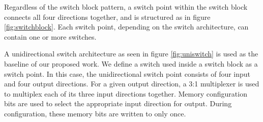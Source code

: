 Regardless of the switch block pattern, a switch point within the switch block connects all four directions together, and is structured as in figure \ref{fig:switchblock}. Each switch point, depending on the switch architecture, can contain one or more switches.


A unidirectional switch architecture as seen in figure \ref{fig:uniswitch} is used as the baseline of our proposed work. We define a switch used inside a switch block as a switch point. In this case, the unidirectional switch point consists of four input and four output directions. For a given output direction, a 3:1 multiplexer is used to multiplex each of its three input directions together. Memory configuration bits are used to select the appropriate input direction for output. During configuration, these memory bits are written to only once.

